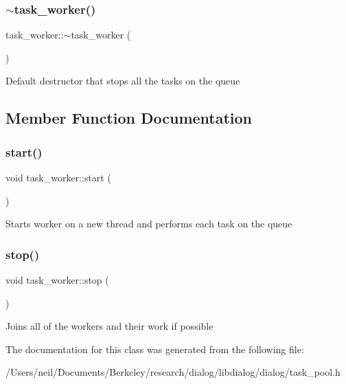 \subsubsection{\texorpdfstring{$\sim$task\+\_\+worker()}{~task\_worker()}}
{\footnotesize\ttfamily task\+\_\+worker\+::$\sim$task\+\_\+worker (\begin{DoxyParamCaption}{ }\end{DoxyParamCaption})\hspace{0.3cm}{\ttfamily [inline]}}

Default destructor that stops all the tasks on the queue 

\subsection{Member Function Documentation}
\mbox{\label{classtask__worker_aa33aec83ef4e75f6a715176a31913d70}} 
\subsubsection{\texorpdfstring{start()}{start()}}
{\footnotesize\ttfamily void task\+\_\+worker\+::start (\begin{DoxyParamCaption}{ }\end{DoxyParamCaption})\hspace{0.3cm}{\ttfamily [inline]}}

Starts worker on a new thread and performs each task on the queue \mbox{\label{classtask__worker_aaa4b11b564b47d366e3acbe0e8205595}} 
\subsubsection{\texorpdfstring{stop()}{stop()}}
{\footnotesize\ttfamily void task\+\_\+worker\+::stop (\begin{DoxyParamCaption}{ }\end{DoxyParamCaption})\hspace{0.3cm}{\ttfamily [inline]}}

Joins all of the workers and their work if possible 

The documentation for this class was generated from the following file\+:\begin{DoxyCompactItemize}
\item 
/\+Users/neil/\+Documents/\+Berkeley/research/dialog/libdialog/dialog/task\+\_\+pool.\+h\end{DoxyCompactItemize}
